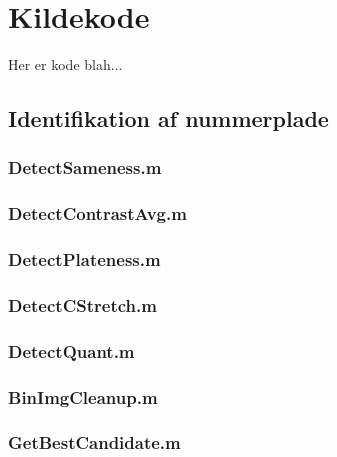 \documentclass[11pt,a4paper,final]{article}
\begin{document}
\appendix


\section{Kildekode}
Her er kode blah...

\subsection{Identifikation af nummerplade}

\subsubsection{DetectSameness.m}
\label{code:DetectSameness}


\subsubsection{DetectContrastAvg.m}
\label{code:DetectContrastAvg}


\subsubsection{DetectPlateness.m}
\label{code:DetectPlateness}


\subsubsection{DetectCStretch.m}
\label{code:DetectCStretch}


\subsubsection{DetectQuant.m}
\label{code:DetectQuant}


\subsubsection{BinImgCleanup.m}
\label{code:BinImgCleanup}


\subsubsection{GetBestCandidate.m}
\label{code:GetBestCandidate}

\end{document}
